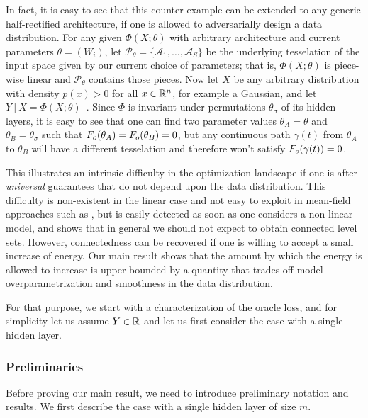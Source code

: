 In fact, it is easy to see that this counter-example can be extended to any generic half-rectified architecture, if one is 
allowed to adversarially design a data distribution. For any given $\Phi(X; \theta)$ with arbitrary architecture and current parameters 
$\theta = (W_i)$, let $\mathcal{P}_\theta=\{ \mathcal{A}_1, \dots, \mathcal{A}_S\}$ be the underlying tesselation of the input space given by our current choice of parameters; that is, $\Phi(X; \theta)$ is piece-wise linear and $\mathcal{P}_\theta$ contains those pieces. Now let 
$X$ be any arbitrary distribution with density $p(x) > 0$ for all $x \in {\mathbb{R}}^n$, for example a Gaussian, and let %
$Y ~|~X = \Phi(X ; \theta)$~. Since $\Phi$ is invariant under permutations $\theta_\sigma$ of its hidden layers, it is easy to see that one can find two parameter values $\theta_A = \theta$ and $\theta_B = \theta_\sigma$ such that $F_{o}(\theta_A) = F_{o}(\theta_B) = 0$, but any continuous path $\gamma(t)$ from $\theta_A$ to $\theta_B$ will have a different tesselation and therefore won't satisfy $F_{o}( \gamma(t) ) = 0$. 
 
This illustrates an intrinsic difficulty in the optimization landscape if one is after \emph{universal} 
guarantees that do not depend upon the data distribution. This difficulty is non-existent in the linear case 
and not easy to exploit in mean-field approaches such as \cite{choromaska}, but 
is easily detected as soon as one considers a non-linear model, and shows that in general 
we should not expect to obtain connected level sets. However, 
connectedness can be recovered if one is willing to accept a small increase 
of energy. Our main result shows that the amount by which the energy is 
allowed to increase is upper bounded by a quantity that trades-off model overparametrization 
and smoothness in the data distribution.

For that purpose, we start with a characterization of the oracle loss, and for simplicity let us assume 
$Y \in {\mathbb{R}}$ and let us first consider the case with a single hidden layer. 

\subsubsection{Preliminaries}
 Before proving our main result, we need to introduce  preliminary notation and results. 
We first describe the case with a single hidden layer of size $m$. 

